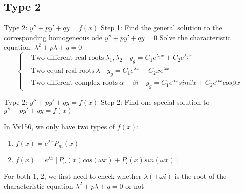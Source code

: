 \subsection{Type 2}





\begin{frame}{Type 2: $y'' + py' + qy = f(x)$}
    Step 1: Find the general solution to the corresponding homogeneous ode $y'' + py' + qy = 0$
    Solve the characteristic equation: $\lambda^2 + p\lambda + q = 0$
    \begin{equation*}
        \left\{
        \begin{aligned}
             & \text{Two different real roots} \ \lambda_1, \lambda_2 \quad y_g = C_1 e^{\lambda_1 x} + C_2 e^{\lambda_2 x}               \\
             & \text{Two equal real roots} \ \lambda \quad y_g = C_1 e^{\lambda x} + C_2 xe^{\lambda x}                                   \\
             & \text{Two different complex roots} \ \alpha\pm \beta i \quad y_g = C_1 e^{\alpha x}sin\beta x + C_2 e^{\alpha x}cos\beta x
        \end{aligned}
        \right.
    \end{equation*}

\end{frame}





\begin{frame}{Type 2: $y'' + py' + qy = f(x)$}
    Step 2: Find one special solution to $y'' + py' + qy = f(x)$

    In Vv156, we only have two types of $f(x)$:
    \begin{enumerate}
        \item $f(x) = e^{\lambda x}P_m(x)$
        \item $f(x) = e^{\lambda x}[P_n(x)cos(\omega x) + P_l(x) sin(\omega x)]$
    \end{enumerate}
    For both 1, 2, we first need to check whether $\lambda (\pm \omega i)$ is the root of the characteristic equation $\lambda^2 + p \lambda + q = 0$ or not



\end{frame}





